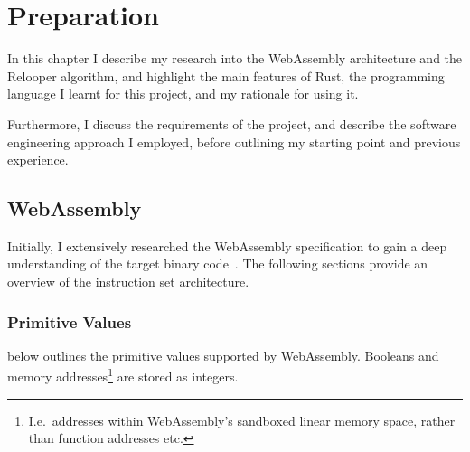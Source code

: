 \documentclass[00-main.tex]{subfiles}
\begin{document}
\chapter{Preparation}

In this chapter I describe my research into the WebAssembly architecture and the Relooper algorithm, and highlight the main features of Rust, the programming language I learnt for this project, and my rationale for using it.

Furthermore, I discuss the requirements of the project, and describe the software engineering approach I employed, before outlining my starting point and previous experience.

\section{WebAssembly}

Initially, I extensively researched the WebAssembly specification to gain a deep understanding of the target binary code~.
The following sections provide an overview of the instruction set architecture.

\subsection{Primitive Values}

 below outlines the primitive values supported by WebAssembly.
Booleans and memory addresses\footnote{I.e.\ addresses within WebAssembly's sandboxed linear memory space, rather than function addresses etc.} are stored as integers.

\begin{table}[t]
  \addtolength{\belowcaptionskip}{\medskipamount}
  \centering
  \caption{Summary of the primitive types supported by WebAssembly. The `constructor' is the name of the type in code and in the specification.}
  \label{tab:wasm value types} %
\end{table}
\end{document}
